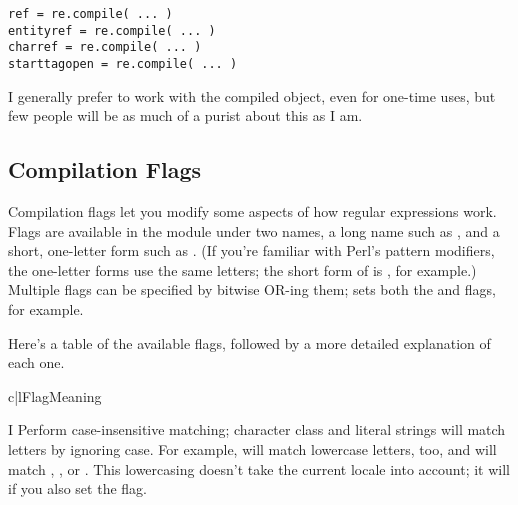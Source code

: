 \documentclass{howto}
\begin{document}
\begin{verbatim}
ref = re.compile( ... )
entityref = re.compile( ... )
charref = re.compile( ... )
starttagopen = re.compile( ... )
\end{verbatim}

I generally prefer to work with the compiled object, even for
one-time uses, but few people will be as much of a purist about this
as I am.

\subsection{Compilation Flags}

Compilation flags let you modify some aspects of how regular
expressions work.  Flags are available in the  module under
two names, a long name such as , and a short,
one-letter form such as .  (If you're familiar with Perl's
pattern modifiers, the one-letter forms use the same letters; the
short form of  is , for example.)
Multiple flags can be specified by bitwise OR-ing them;  sets both the  and  flags, for example.

Here's a table of the available flags, followed by
a more detailed explanation of each one.

\begin{tableii}{c|l}{}{Flag}{Meaning}
\end{tableii}

\begin{datadesc}{I}
Perform case-insensitive matching; character class and literal strings
will match
letters by ignoring case.  For example, \regexp{[A-Z]} will match
lowercase letters, too, and  will match ,
, or .
This lowercasing doesn't take the current locale into account; it will
if you also set the  flag.
\end{datadesc}
\end{document}
